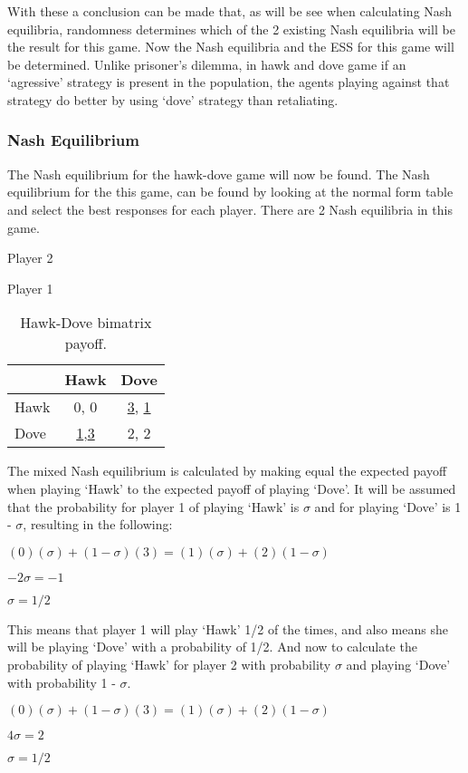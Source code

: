 With these a conclusion can be made that, as will be see when calculating Nash equilibria, randomness determines which of the 2 existing Nash equilibria will be the result for this game. Now the Nash equilibria and the ESS for this game will be determined.  Unlike prisoner's dilemma, in hawk and dove game if an `agressive' strategy is present in the population, the agents playing against that strategy do better by using `dove' strategy than retaliating.

\subsubsection{Nash Equilibrium}
The Nash equilibrium for the hawk-dove game will now be found. The Nash equilibrium for the this game,  can be found by looking at the normal form table and select the best responses for each player. There are 2 Nash equilibria in this game.

\begin{table}[H]
\begin{center}
Player 2

Player 1
\begin{tabular}{|l|c|c|}
\hline
 & Hawk & Dove\\ 
\hline
Hawk & 0, 0 & \underline{3}, \underline{1}\\
\hline
Dove & \underline{1},\underline{3} & 2, 2\\
\hline
\end{tabular}

\caption{ Hawk-Dove bimatrix payoff.}
\label{fig:mpnashhd}	
\end{center}
\end{table}

The mixed Nash equilibrium is calculated by making equal the expected payoff  when playing `Hawk' to the expected payoff of playing `Dove'. It will be assumed that the probability for player 1 of playing `Hawk' is $\sigma$ and for playing `Dove' is 1 - $\sigma$, resulting in the following:
\begin{center}
$(0)(\sigma) + (1 - \sigma)(3) = (1)(\sigma) + (2)(1 - \sigma)$
\end{center}
\begin{center}
$-2 \sigma = -1$
\end{center}
\begin{center}
$\sigma = 1/2$
\end{center}
This means that player 1 will play `Hawk' 1/2 of the times, and also means she will be playing `Dove' with a probability of 1/2. And now to calculate the probability of playing `Hawk' for player 2 with probability $\sigma$ and playing `Dove' with probability 1 - $\sigma$.
\begin{center}
$(0)(\sigma) + (1 - \sigma)(3) = (1)(\sigma) + (2)(1 - \sigma)$
\end{center}
\begin{center}
$4 \sigma = 2$
\end{center}
\begin{center}
$\sigma = 1/2$
\end{center}

